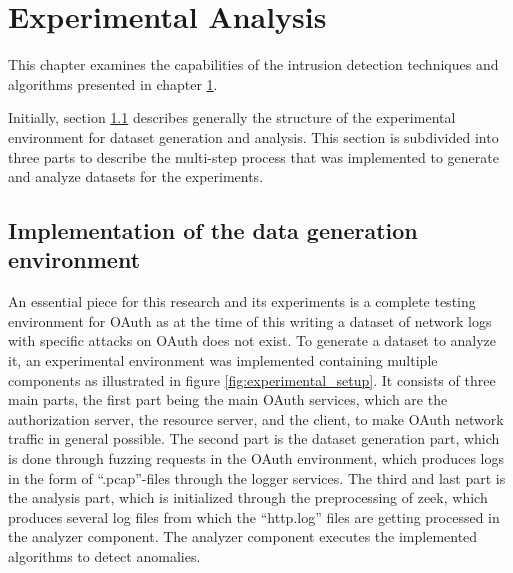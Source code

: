 \documentclass[
    fontsize=12pt,
    headings=small,
    parskip=half,           %
    bibliography=totoc,
    numbers=noenddot,       %
    open=any,               %
    ]{scrreprt}
\begin{document}
\chapter{Experimental Analysis}
\label{chap:experimental_analysis}
This chapter examines the capabilities of the intrusion detection techniques and algorithms presented in chapter \ref{chap:experimental_analysis}.

Initially, section \ref{sec:exp_setup} describes generally the structure of the experimental environment for dataset generation and analysis. This section is subdivided into three parts to describe the multi-step process that was implemented to generate and analyze datasets for the experiments.

\section{Implementation of the data generation environment}
\label{sec:exp_setup}

An essential piece for this research and its experiments is a complete testing environment for OAuth as at the time of this writing a dataset of network logs with specific attacks on OAuth does not exist. To generate a dataset to analyze it, an experimental environment was implemented containing multiple components as illustrated in figure \ref{fig:experimental_setup}. It consists of three main parts, the first part being the main OAuth services, which are the authorization server, the resource server, and the client, to make OAuth network traffic in general possible. The second part is the dataset generation part, which is done through fuzzing requests in the OAuth environment, which produces logs in the form of ``.pcap''-files through the logger services. The third and last part is the analysis part, which is initialized through the preprocessing of zeek, which produces several log files from which the ``http.log'' files are getting processed in the analyzer component. The analyzer component executes the implemented algorithms to detect anomalies.
\end{document}
